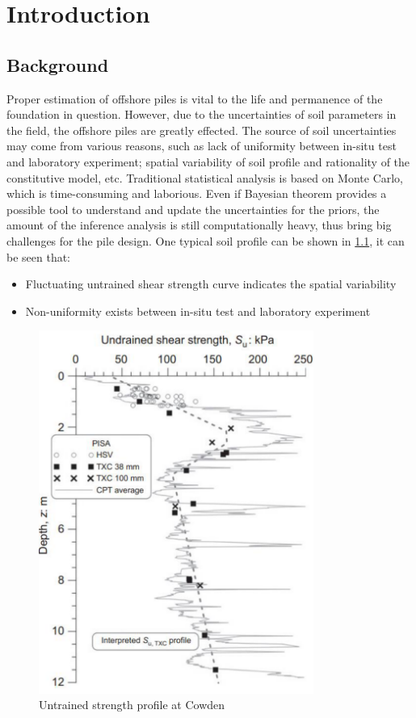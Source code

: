 \chapter{Introduction}

\section{Background}


Proper estimation of offshore piles is vital to the life and permanence of the foundation in question. However, due to the uncertainties of soil parameters in the field, the offshore piles are greatly effected. The source of soil uncertainties may come from various reasons, such as  lack of uniformity between in-situ test and laboratory  experiment; spatial variability of soil profile and rationality of the constitutive model, etc. Traditional statistical analysis is based on Monte Carlo, which is time-consuming and laborious. Even if Bayesian theorem provides a possible tool to understand and update the uncertainties for the priors, the amount of the inference analysis is still computationally heavy, thus bring big challenges for the pile design.
One typical soil profile can be shown in \cref{fig:fig1.1}, it can be seen that:

\setlength{\parskip}{0pt}

\begin{itemize}

    \item Fluctuating untrained shear strength curve indicates the spatial  variability
    \item Non-uniformity exists between in-situ test and laboratory experiment

\end{itemize}

\begin{figure}[htbp]
    \centering
    \includegraphics[width = 90mm]{Figures/figure1.pdf}
    \caption{Untrained strength profile at Cowden \protect\cite{zdravkovic2020}}
    \label{fig:fig1.1}
\end{figure}


